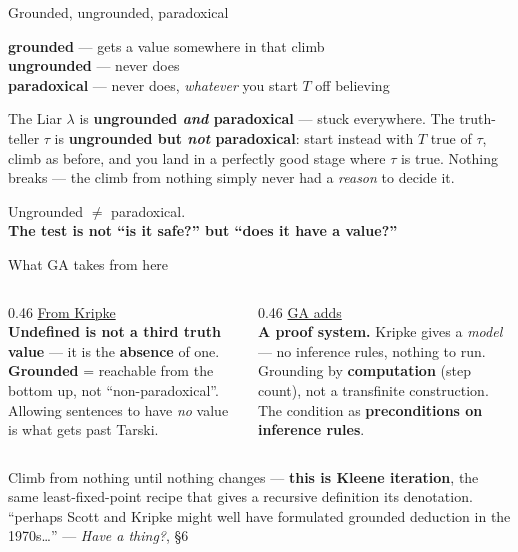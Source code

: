 \documentclass[aspectratio=169,11pt]{beamer}
\newcommand{\key}[1]{{\color{accent}\textbf{#1}}}
\newcommand{\bad}[1]{{\color{warn}\textbf{#1}}}
\newcommand{\amber}[1]{{\color{gap}\textbf{#1}}}
\begin{document}
\begin{frame}{Grounded, ungrounded, paradoxical}
  \vfill
  \begin{center}\large
    \key{grounded} --- gets a value somewhere in that climb\\[0.4em]
    \key{ungrounded} --- never does\\[0.4em]
    \key{paradoxical} --- never does, \emph{whatever} you start $T$ off believing
  \end{center}
  \vfill
  \pause
  The Liar $\lambda$ is \bad{ungrounded \emph{and} paradoxical} --- stuck everywhere.
  \vfill
  The truth-teller $\tau$ is \amber{ungrounded but \emph{not} paradoxical}: start
  instead with $T$ true of $\tau$, climb as before, and you land in a perfectly good
  stage where $\tau$ is true. Nothing breaks --- the climb from nothing simply never
  had a \emph{reason} to decide it.
  \vfill
  \pause
  \begin{center}\large
    Ungrounded $\neq$ paradoxical.\\[0.3em]
    \key{The test is not ``is it safe?'' but ``does it have a value?''}
  \end{center}
  \vfill
\end{frame}

\begin{frame}{What GA takes from here}
  \begin{columns}[T]
    \begin{column}{0.46\textwidth}
      \underline{From Kripke}\\[0.6em]
      {\small
       \key{Undefined is not a third truth value} --- it is the \key{absence}
       of one.\\[0.5em]
       \key{Grounded} = reachable from the bottom up, not ``non-paradoxical''.\\[0.5em]
       Allowing sentences to have \emph{no} value is what gets past Tarski.}
    \end{column}
    \begin{column}{0.46\textwidth}
      \underline{GA adds}\\[0.6em]
      {\small
       \key{A proof system.} Kripke gives a \emph{model} --- no inference rules,
       nothing to run.\\[0.5em]
       Grounding by \key{computation} (step count), not a transfinite construction.\\[0.5em]
       The condition as \key{preconditions on inference rules}.}
    \end{column}
  \end{columns}

  \vfill
  \pause
  \begin{center}
    Climb from nothing until nothing changes --- \key{this is Kleene iteration},
    the same least-fixed-point recipe that gives a recursive definition its
    denotation.\\[0.4em]
    {\small ``perhaps Scott and Kripke might well have formulated grounded
     deduction in the 1970s\dots'' \hfill{\footnotesize --- \emph{Have a thing?}, \S6}}
  \end{center}
  \vfill
\end{frame}
\end{document}
